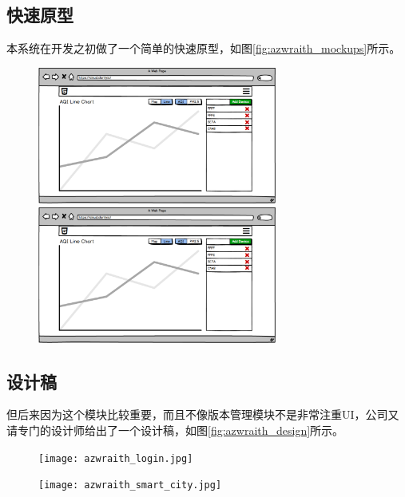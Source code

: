 \subsection{快速原型}
本系统在开发之初做了一个简单的快速原型，如图\ref{fig:azwraith_mockups}所示。
\begin{figure}[H]
 \centering
 \includegraphics[width=0.7\textwidth]{pdf/azwraith_prototype.pdf}

 \vspace{0.1cm}

 \includegraphics[width=0.7\textwidth, page=2]{pdf/azwraith_prototype.pdf}
\end{figure}

\subsection{设计稿}
但后来因为这个模块比较重要，而且不像版本管理模块不是非常注重UI，公司又请专门的设计师给出了一个设计稿，如图\ref{fig:azwraith_design}所示。
\begin{figure}[htb]
 \centering
 \texttt{[image: azwraith\_login.jpg]}

 \vspace{0.1cm}

 \texttt{[image: azwraith\_smart\_city.jpg]}
\end{figure}


